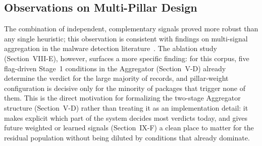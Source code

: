 \documentclass[journal]{IEEEtran}
\begin{document}
\subsection{Observations on Multi-Pillar Design}
The combination of independent, complementary signals proved more robust than any single heuristic; this
observation is consistent with findings on multi-signal aggregation in the malware detection
literature~\cite{sejfia2022}. The ablation study (Section~VIII-E), however, surfaces a more specific finding:
for this corpus, five flag-driven Stage~1 conditions in the Aggregator (Section~V-D) already determine the
verdict for the large majority of records, and pillar-weight configuration is decisive only for the minority
of packages that trigger none of them. This is the direct motivation for formalizing the two-stage Aggregator
structure (Section~V-D) rather than treating it as an implementation detail: it makes explicit which part of
the system decides most verdicts today, and gives future weighted or learned signals (Section~IX-F) a clean
place to matter for the residual population without being diluted by conditions that already dominate.
\end{document}
